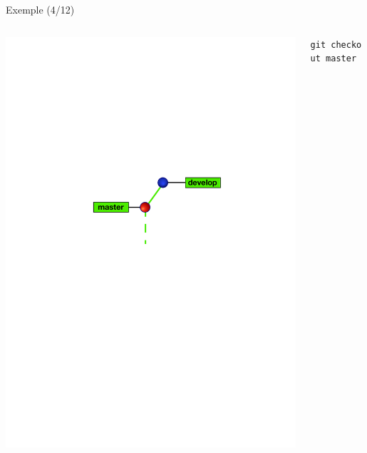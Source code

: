 \begin{frame}[fragile]{%
\protect\hypertarget{exemple-412}{%
Exemple (4/12)}}

\begin{columns}[T]
\begin{column}{0.40\textwidth}
\includegraphics[width=1\textwidth]{images/branch4.pdf}
\end{column}

\begin{column}{0.60\textwidth}
\texttt{git\ checkout\ master}
\end{column}
\end{columns}

\end{frame}

